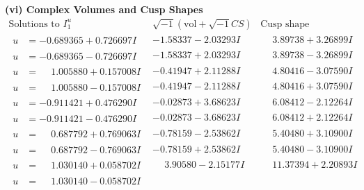 \documentclass[1p]{elsarticle_modified}
\theoremstyle{definition}
\newcommand{\I}{\sqrt{-1}}
\begin{document}
\newpage\flushleft \textbf{(vi) Complex Volumes and Cusp Shapes}
$$\begin{array}{c|c|c}  
\text{Solutions to }I^u_{1}& \I (\text{vol} + \sqrt{-1}CS) & \text{Cusp shape}\\
 \hline 
\begin{aligned}
u &= -0.689365 + 0.726697 I\end{aligned}
 & -1.58337 - 2.03293 I & \phantom{-}3.89738 + 3.26899 I \\ \hline\begin{aligned}
u &= -0.689365 - 0.726697 I\end{aligned}
 & -1.58337 + 2.03293 I & \phantom{-}3.89738 - 3.26899 I \\ \hline\begin{aligned}
u &= \phantom{-}1.005880 + 0.157008 I\end{aligned}
 & -0.41947 + 2.11288 I & \phantom{-}4.80416 - 3.07590 I \\ \hline\begin{aligned}
u &= \phantom{-}1.005880 - 0.157008 I\end{aligned}
 & -0.41947 - 2.11288 I & \phantom{-}4.80416 + 3.07590 I \\ \hline\begin{aligned}
u &= -0.911421 + 0.476290 I\end{aligned}
 & -0.02873 + 3.68623 I & \phantom{-}6.08412 - 2.12264 I \\ \hline\begin{aligned}
u &= -0.911421 - 0.476290 I\end{aligned}
 & -0.02873 - 3.68623 I & \phantom{-}6.08412 + 2.12264 I \\ \hline\begin{aligned}
u &= \phantom{-}0.687792 + 0.769063 I\end{aligned}
 & -0.78159 - 2.53862 I & \phantom{-}5.40480 + 3.10900 I \\ \hline\begin{aligned}
u &= \phantom{-}0.687792 - 0.769063 I\end{aligned}
 & -0.78159 + 2.53862 I & \phantom{-}5.40480 - 3.10900 I \\ \hline\begin{aligned}
u &= \phantom{-}1.030140 + 0.058702 I\end{aligned}
 & \phantom{-}3.90580 - 2.15177 I & \phantom{-}11.37394 + 2.20893 I \\ \hline\begin{aligned}
u &= \phantom{-}1.030140 - 0.058702 I\end{aligned}

\end{array}$$
\end{document}
